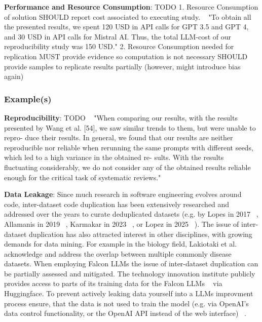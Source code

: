\textbf{Performance and Resource Consumption}: TODO
1. Resource Consumption of solution
SHOULD report cost associated to executing study. ~\cite{10.1145/3673791.3698432} "To obtain all the presented results, we spent 120 USD in API calls for GPT 3.5 and GPT 4, and 30 USD in API calls for Mistral AI. Thus, the total LLM-cost of our reproducibility study was 150 USD."
2. Resource Consumption needed for replication
MUST provide evidence so computation is not necessary
SHOULD provide samples to replicate results partially (however, might introduce bias again)


\subsubsection{Example(s)}
\textbf{Reproducibility}: TODO
~\cite{10.1145/3673791.3698432} "When comparing our results, with the results presented by Wang et al. [54], we saw similar trends to them, but were unable to repro- duce their results. In general, we found that our results are neither reproducible nor reliable when rerunning the same prompts with different seeds, which led to a high variance in the obtained re- sults. With the results fluctuating considerably, we do not consider any of the obtained results reliable enough for the critical task of systematic reviews."

\textbf{Data Leakage}:
Since much research in software engineering evolves around code, inter-dataset code duplication has been extensively researched and addressed over the years to curate deduplicated datasets (e.g. by Lopes in 2017 ~\cite{10.1145/3133908}, Allamanis in 2019 ~\cite{10.1145/3359591.3359735}, Karmakar in 2023 ~\cite{10.1007/s10664-022-10275-7}, or Lopez in 2025 ~\cite{inter-dataset-lopez2025}).
The issue of inter-dataset duplication has also attracted interest in other disciplines, with growing demands for data mining. For example in the biology field, Lakiotaki et al. ~\cite{10.1093/database/bay011} acknowledge and address the overlap between multiple commonly disease datasets. 
When employing Falcon LLMs the issue of inter-dataset duplication can be partially assessed and mitigated. The technology innovation institute publicly provides access to parts of its training data for the Falcon LLMs ~\cite{technology_innovation_institute_2023} via Huggingface.
To prevent actively leaking data yourself into a LLMs improvment process ensure, that the data is not used to train the model (e.g. via OpenAI's data control functionality, or the OpenAI API instead of the web interface) ~\cite{balloccu-etal-2024-leak}.

